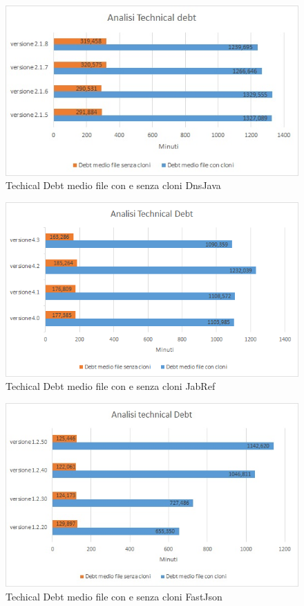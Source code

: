 \begin{figure}[h]
	\centering
	\includegraphics[scale=0.7, trim = 0cm 0cm 0cm 0cm, clip=true]{Grafici_dnsJava/TechnicalDebt.jpg}
	\caption{Techical Debt medio file con e senza cloni DnsJava}
	\label{fig:tdDnsJava}	
\end{figure}
\begin{figure}[h]
	\centering
	\includegraphics[scale=0.7, trim = 0cm 0cm 0cm 0cm, clip=true]{Grafici_jabRef/TechnicalDebt.png}
	\caption{Techical Debt medio file con e senza cloni JabRef}
	\label{fig:tdJabRef}
\end{figure}
\begin{figure}[h]
	\centering
	\includegraphics[scale=0.7, trim = 0cm 0cm 0cm 0cm, clip=true]{Grafici_fastJson/TechnicalDebt.jpg}
	\caption{Techical Debt medio file con e senza cloni FastJson}
	\label{fig:tdFastjson}
\end{figure}

